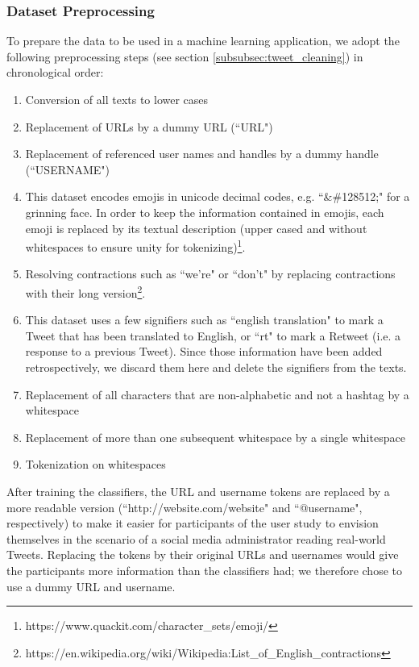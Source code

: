 \subsubsection{Dataset Preprocessing}
To prepare the data to be used in a machine learning application, we adopt the following preprocessing steps (see section \ref{subsubsec:tweet_cleaning}) in chronological order:
\begin{enumerate}
	\item Conversion of all texts to lower cases
	\item Replacement of URLs by a dummy URL (``URL")
	\item Replacement of referenced user names and handles by a dummy handle (``USERNAME")
	\item This dataset encodes emojis in unicode decimal codes, e.g. ``\&\#128512;" for a grinning face. In order to keep the information contained in emojis, each emoji is replaced by its textual description (upper cased and without whitespaces to ensure unity for tokenizing)\footnote{https://www.quackit.com/character\_sets/emoji/}.
	\item Resolving contractions such as ``we're" or ``don't" by replacing contractions with their long version\footnote{https://en.wikipedia.org/wiki/Wikipedia:List\_of\_English\_contractions}.
	\item This dataset uses a few signifiers such as ``english translation" to mark a Tweet that has been translated to English, or ``rt" to mark a Retweet (i.e. a response to a previous Tweet). Since those information have been added retrospectively, we discard them here and delete the signifiers from the texts.
	\item Replacement of all characters that are non-alphabetic and not a hashtag by a whitespace
	\item Replacement of more than one subsequent whitespace by a single whitespace
	\item Tokenization on whitespaces
\end{enumerate}
After training the classifiers, the URL and username tokens are replaced by a more readable version (``http://website.com/website" and ``@username", respectively) to make it easier for participants of the user study to envision themselves in the scenario of a social media administrator reading real-world Tweets. Replacing the tokens by their original URLs and usernames would give the participants more information than the classifiers had; we therefore chose to use a dummy URL and username.\medskip\newline

